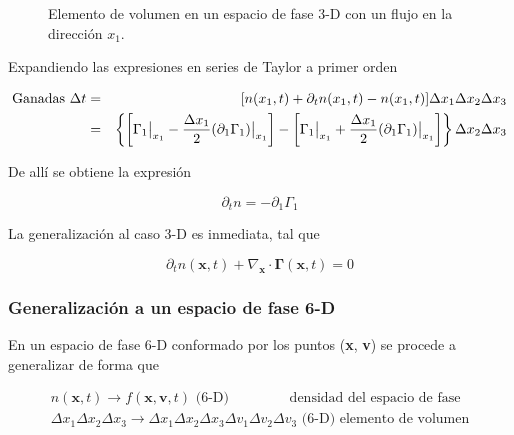 \begin{figure}[htb!]
  \centering
  \label{fig:box}
  \caption{Elemento de volumen en un espacio de fase 3-D con un flujo en la direcci\'on $x_1$.}
\end{figure}

Expandiendo las expresiones en series de Taylor a primer orden

\begin{eqnarray}
  \text{Ganadas }\Delta t &=& [ n(x_1,t) + \partial_t n(x_1,t) - n(x_1, t)]\Delta x_1\Delta x_2\Delta x_3 \nonumber\\ 
                          &=& \left\{ \left[\Gamma_{1}\big{|}_{x_1} - \frac{\Delta x_1}{2}(\partial_{1}\Gamma_{1})\big{|}_{x_1}\right] - \left[\Gamma_{1}\big{|}_{x_1} + \frac{\Delta x_1}{2}(\partial_{1}\Gamma_{1})\big{|}_{x_1}\right]\right\}\Delta x_2\Delta x_3\nonumber
  \end{eqnarray}

De all\'i se obtiene la expresi\'on

\begin{equation*}
  \partial_{t} n = -\partial_{1}\Gamma_{1}
\end{equation*}

La generalizaci\'on al caso 3-D es inmediata, tal que 

\begin{equation*}
  \partial_t n(\textbf{x}, t) + \nabla_\textbf{x}\cdot\pmb{\Gamma}(\textbf{x},t) = 0
\end{equation*}

\subsubsection{Generalizaci\'on a un espacio de fase 6-D}

En un espacio de fase 6-D conformado por los puntos (\textbf{x}, \textbf{v}) se procede a generalizar de forma que 

\begin{eqnarray*}
  n(\textbf{x},t) \rightarrow f(\textbf{x}, \textbf{v},t) \text{ (6-D) } \quad \quad \quad \quad \text{densidad del espacio de fase}\\
  \Delta x_1\Delta x_2\Delta x_3 \rightarrow \Delta x_{1}\Delta x_2\Delta x_3\Delta v_{1}\Delta v_{2}\Delta v_{3} \text{ (6-D) } \text{elemento de volumen}
\end{eqnarray*}

